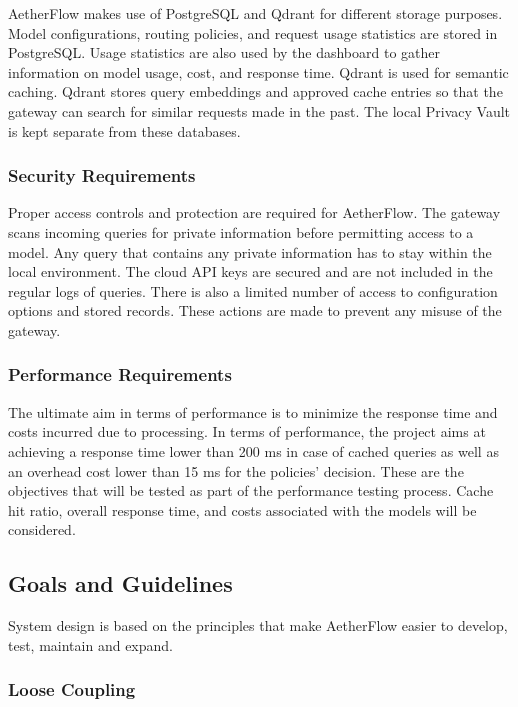 \documentclass{FastFyp}
\begin{document}
AetherFlow makes use of PostgreSQL and Qdrant for different storage purposes. Model configurations, routing policies, and request usage statistics are stored in PostgreSQL. Usage statistics are also used by the dashboard to gather information on model usage, cost, and response time. Qdrant is used for semantic caching. Qdrant stores query embeddings and approved cache entries so that the gateway can search for similar requests made in the past. The local Privacy Vault is kept separate from these databases.

\subsubsection{Security Requirements}

Proper access controls and protection are required for AetherFlow. The gateway scans incoming queries for private information before permitting access to a model. Any query that contains any private information has to stay within the local environment. The cloud API keys are secured and are not included in the regular logs of queries. There is also a limited number of access to configuration options and stored records. These actions are made to prevent any misuse of the gateway.

\subsubsection{Performance Requirements}

The ultimate aim in terms of performance is to minimize the response time and costs incurred due to processing. In terms of performance, the project aims at achieving a response time lower than 200 ms in case of cached queries as well as an overhead cost lower than 15 ms for the policies' decision. These are the objectives that will be tested as part of the performance testing process. Cache hit ratio, overall response time, and costs associated with the models will be considered.

\subsection{Goals and Guidelines}

System design is based on the principles that make AetherFlow easier to develop, test, maintain and expand.

\subsubsection{Loose Coupling}
\end{document}
